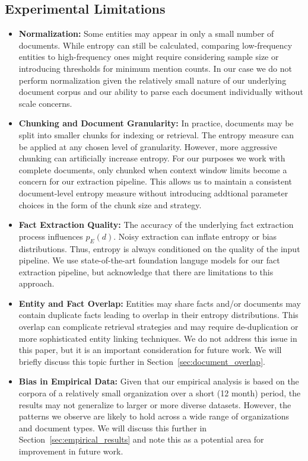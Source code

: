 \documentclass[11pt,a4paper]{article}
\begin{document}
\subsection{Experimental Limitations} \label{sec:limitations}

\begin{itemize}
\item \textbf{Normalization:} Some entities may appear in only a small number of documents. While entropy can still be calculated, comparing low-frequency entities to high-frequency ones might require considering sample size or introducing thresholds for minimum mention counts. In our case we do not perform normalization given the relatively small nature of our underlying document corpus and our ability to parse each document individually without scale concerns.

\item \textbf{Chunking and Document Granularity:} In practice, documents may be split into smaller chunks for indexing or retrieval. The entropy measure can be applied at any chosen level of granularity. However, more aggressive chunking can artificially increase entropy. For our purposes we work with complete documents, only chunked when context window limits become a concern for our extraction pipeline. This allows us to maintain a consistent document-level entropy measure without introducing addtional parameter choices in the form of the chunk size and strategy.

\item \textbf{Fact Extraction Quality:} The accuracy of the underlying fact extraction process influences $p_{E}(d)$. Noisy extraction can inflate entropy or bias distributions. Thus, entropy is always conditioned on the quality of the input pipeline. We use state-of-the-art foundation languge models for our fact extraction pipeline, but acknowledge that there are limitations to this approach.

\item \textbf{Entity and Fact Overlap:} Entities may share facts and/or documents may contain duplicate facts leading to overlap in their entropy distributions. This overlap can complicate retrieval strategies and may require de-duplication or more sophisticated entity linking techniques. We do not address this issue in this paper, but it is an important consideration for future work. We will briefly discuss this topic further in Section~\ref{sec:document_overlap}.

\item \textbf{Bias in Empirical Data:} Given that our empirical analysis is based on the corpora of a relatively small organization over a short (12 month) period, the results may not generalize to larger or more diverse datasets. However, the patterns we observe are likely to hold across a wide range of organizations and document types. We will discuss this further in Section~\ref{sec:empirical_results} and note this as a potential area for improvement in future work.
\end{itemize}
\end{document}
